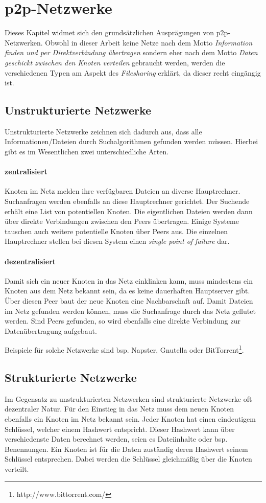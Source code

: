 \section{p2p-Netzwerke}
Dieses Kapitel widmet sich den grundsätzlichen Ausprägungen von p2p-Netzwerken. Obwohl in dieser Arbeit keine Netze nach dem Motto \emph{Information finden und per Direktverbindung übertragen} sondern eher nach dem Motto \emph{Daten geschickt zwischen den Knoten verteilen} gebraucht werden, werden die verschiedenen Typen am Aspekt des \emph{Filesharing} erklärt, da dieser recht eingängig ist.


\subsection{Unstrukturierte Netzwerke}
Unstrukturierte Netzwerke zeichnen sich dadurch aus, dass alle Informationen/Dateien durch Suchalgorithmen gefunden werden müssen. Hierbei gibt es im Wesentlichen zwei unterschiedliche Arten.

\paragraph{zentralisiert} Knoten im Netz melden ihre verfügbaren Dateien an diverse Hauptrechner. Suchanfragen werden ebenfalls an diese Hauptrechner gerichtet. Der Suchende erhält eine List von potentiellen Knoten. Die eigentlichen Dateien werden dann über direkte Verbindungen zwischen den Peers übertragen. Einige Systeme tauschen auch weitere potentielle Knoten über Peers aus. Die einzelnen Hauptrechner stellen bei diesen System einen \emph{single point of failure} dar.

\paragraph{dezentralisiert} Damit sich ein neuer Knoten in das Netz einklinken kann, muss mindestens ein Knoten aus dem Netz bekannt sein, da es keine dauerhaften Hauptserver gibt. Über diesen Peer baut der neue Knoten eine Nachbarschaft auf. Damit Dateien im Netz gefunden werden können, muss die Suchanfrage durch das Netz geflutet werden. Sind Peers gefunden, so wird ebenfalls eine direkte Verbindung zur Datenübertragung aufgebaut.

Beispiele für solche Netzwerke sind bsp. Napster, Gnutella oder BitTorrent\footnote{http://www.bittorrent.com/}.

\subsection{Strukturierte Netzwerke}
Im Gegensatz zu unstrukturierten Netzwerken sind strukturierte Netzwerke oft dezentraler Natur. Für den Einstieg in das Netz muss dem neuen Knoten ebenfalls ein Knoten im Netz bekannt sein. Jeder Knoten hat einen eindeutigem Schlüssel, welcher einem Hashwert entspricht. Dieser Hashwert kann über verschiedenste Daten berechnet werden, seien es Dateiinhalte oder bsp. Benennungen. Ein Knoten ist für die Daten zuständig deren Hashwert seinem Schlüssel entsprechen. Dabei werden die Schlüssel gleichmäßig über die Knoten verteilt.

